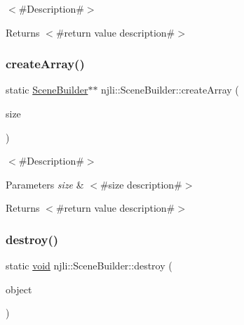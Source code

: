 $<$\#\+Description\#$>$

\begin{DoxyReturn}{Returns}
$<$\#return value description\#$>$ 
\end{DoxyReturn}
\mbox{\label{classnjli_1_1_scene_builder_a969a8dfd6b03041f2c1ab018a459188d}} 
\subsubsection{\texorpdfstring{create\+Array()}{createArray()}}
{\footnotesize\ttfamily static \mbox{\hyperlink{classnjli_1_1_scene_builder}{Scene\+Builder}}$\ast$$\ast$ njli\+::\+Scene\+Builder\+::create\+Array (\begin{DoxyParamCaption}\item[{const \mbox{\hyperlink{_util_8h_a10e94b422ef0c20dcdec20d31a1f5049}{u32}}}]{size }\end{DoxyParamCaption})\hspace{0.3cm}{\ttfamily [static]}}

$<$\#\+Description\#$>$


\begin{DoxyParams}{Parameters}
{\em size} & $<$\#size description\#$>$\\
\hline
\end{DoxyParams}
\begin{DoxyReturn}{Returns}
$<$\#return value description\#$>$ 
\end{DoxyReturn}
\mbox{\label{classnjli_1_1_scene_builder_a7cc2b228996ae221236decdcd8c4211f}} 
\subsubsection{\texorpdfstring{destroy()}{destroy()}}
{\footnotesize\ttfamily static \mbox{\hyperlink{_thread_8h_af1e856da2e658414cb2456cb6f7ebc66}{void}} njli\+::\+Scene\+Builder\+::destroy (\begin{DoxyParamCaption}\item[{\mbox{\hyperlink{classnjli_1_1_scene_builder}{Scene\+Builder}} $\ast$}]{object }\end{DoxyParamCaption})\hspace{0.3cm}{\ttfamily [static]}}

